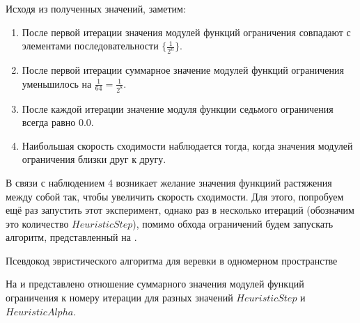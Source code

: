 	Исходя из полученных значений, заметим:
	\begin{enumerate}[1.]
		\item После первой итерации значения модулей функций ограничения совпадают с элементами последовательности $\{\frac{1}{2^n}\}$.
		\item После первой итерации суммарное значение модулей функций ограничения уменьшилось на $\frac{1}{64} =\frac{1}{2^8}$.
		\item После каждой итерации значение модуля функции седьмого ограничения всегда равно $0.0$. 
		\item Наибольшая скорость сходимости наблюдается тогда, когда значения модулей ограничения близки друг к другу.
	\end{enumerate}

	В связи с наблюдением 4 возникает желание  значения функциий растяжения между собой так, чтобы увеличить скорость сходимости. Для этого, попробуем ещё раз запустить этот эксперимент, однако раз в несколько итераций (обозначим это количество $HeuristicStep$), помимо обхода ограничений будем запускать алгоритм, представленный на .
	
	\begin{algorithm} %
		\nonl{}
		\caption{Псевдокод эвристического алгоритма для веревки в одномерном пространстве}\label{alg:Heuristic1D}
	\end{algorithm}
	\FloatBarrier
	
	На  и  представлено отношение суммарного значения модулей функций ограничения к номеру итерации для разных значений $HeuristicStep$ и $HeuristicAlpha$. 
	
